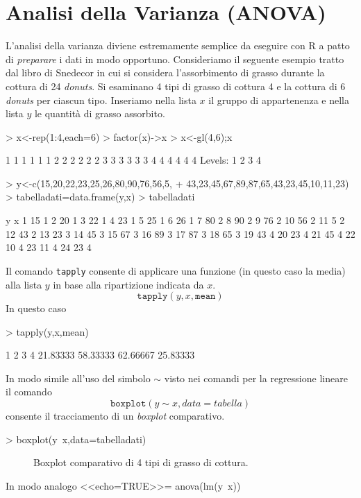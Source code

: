 \documentclass[onecolumn,11pt]{book}
\begin{document}
\section{Analisi della Varianza (ANOVA)}
L'analisi della varianza diviene estremamente semplice da eseguire con \textsf{R}  a patto di \emph{preparare} i dati in modo opportuno.
Consideriamo il seguente esempio tratto dal libro di Snedecor  %
in cui si considera l'assorbimento di grasso durante la cottura di 24 \emph{donuts}. Si esaminano 4 tipi di grasso di cottura 4 e la cottura di 6 \emph{donuts} per ciascun tipo. Inseriamo nella lista  $x$ il gruppo di appartenenza e nella lista $y$ le quantit\`a di grasso assorbito.
\begin{Schunk}
\begin{Sinput}
> x<-rep(1:4,each=6)
> factor(x)->x
> x<-gl(4,6);x
\end{Sinput}
\begin{Soutput}
 [1] 1 1 1 1 1 1 2 2 2 2 2 2 3 3 3 3 3 3 4 4 4 4 4 4
Levels: 1 2 3 4
\end{Soutput}
\begin{Sinput}
> y<-c(15,20,22,23,25,26,80,90,76,56,5,
+ 43,23,45,67,89,87,65,43,23,45,10,11,23)
> tabelladati=data.frame(y,x)
> tabelladati
\end{Sinput}
\begin{Soutput}
    y x
1  15 1
2  20 1
3  22 1
4  23 1
5  25 1
6  26 1
7  80 2
8  90 2
9  76 2
10 56 2
11  5 2
12 43 2
13 23 3
14 45 3
15 67 3
16 89 3
17 87 3
18 65 3
19 43 4
20 23 4
21 45 4
22 10 4
23 11 4
24 23 4
\end{Soutput}
\end{Schunk}
Il comando  \texttt{tapply} consente di applicare una funzione (in questo caso la media) alla lista  $y$ in base alla ripartizione indicata da $x$. 
$$\texttt{tapply}(y,x,\texttt{mean})$$ 
In questo caso
\begin{Schunk}
\begin{Sinput}
> tapply(y,x,mean) 
\end{Sinput}
\begin{Soutput}
       1        2        3        4 
21.83333 58.33333 62.66667 25.83333 
\end{Soutput}
\end{Schunk}
In modo simile all'uso del simbolo $\sim$ visto nei comandi per la regressione lineare il comando
$$\texttt{boxplot}(y\sim x,data=tabella)$$
consente il tracciamento di un \emph{boxplot} comparativo.
\begin{Schunk}
\begin{Sinput}
> boxplot(y~x,data=tabelladati)
\end{Sinput}
\end{Schunk}
\begin{figure}[htbp]
\begin{center}\caption{Boxplot comparativo di 4 tipi di grasso di cottura.}
\label{datiist}
\end{center}
\end{figure}
In modo analogo 
 <<echo=TRUE>>=
anova(lm(y~x))  
   
\end{document}
